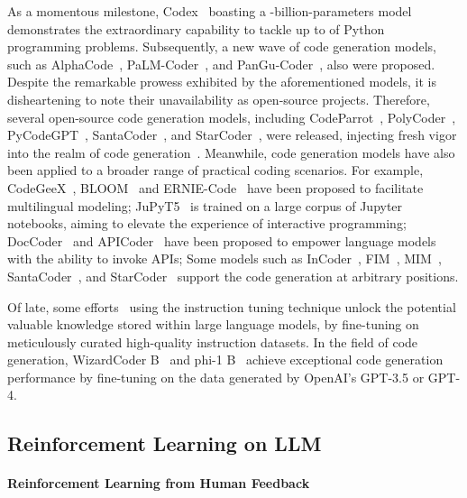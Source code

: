 \documentclass{article}
\begin{document}
As a momentous milestone, Codex~\cite{codex} boasting a -billion-parameters model demonstrates the extraordinary capability to tackle up to  of Python programming problems. Subsequently, a new wave of code generation models, such as AlphaCode~\cite{alphacode}, PaLM-Coder~\cite{palm}, and PanGu-Coder~\cite{pangu-coder}, also were proposed. Despite the remarkable prowess exhibited by the aforementioned models, it is disheartening to note their unavailability as open-source projects. Therefore, several open-source code generation models, including CodeParrot~\cite{codeparrot}, PolyCoder~\cite{polycoder}, PyCodeGPT~\cite{cert}, SantaCoder~\cite{santacoder}, and StarCoder~\cite{starcoder}, were released, injecting fresh vigor into the realm of code generation~\cite{codet}. Meanwhile, code generation models have also been applied to a broader range of practical coding scenarios. For example, CodeGeeX~\cite{codegeex}, BLOOM~\cite{bloom} and ERNIE-Code~\cite{ernie-code} have been proposed to facilitate multilingual modeling; JuPyT5~\cite{jupyt5} is trained on a large corpus of Jupyter notebooks, aiming to elevate the experience of interactive programming; DocCoder~\cite{doccoder} and APICoder~\cite{apicoder} have been proposed to empower language models with the ability to invoke APIs; Some models such as InCoder~\cite{incoder}, FIM~\cite{fim}, MIM~\cite{mim}, SantaCoder~\cite{santacoder}, and StarCoder~\cite{starcoder} support the code generation at arbitrary positions.

Of late, some efforts~\cite{lima,instruction-2} using the instruction tuning technique unlock the potential valuable knowledge stored within large language models, by fine-tuning on meticulously curated high-quality instruction datasets.
In the field of code generation, WizardCoder B~\cite{wizardcoder} and phi-1 B~\cite{phi-1} achieve exceptional code generation performance by fine-tuning on the data generated by OpenAI's GPT-3.5 or GPT-4.



\subsection{Reinforcement Learning on LLM}


\paragraph{Reinforcement Learning from Human Feedback}
\end{document}
